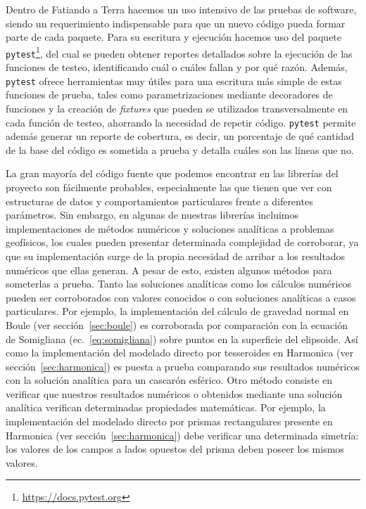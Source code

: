 Dentro de Fatiando a Terra hacemos un uso intensivo de las pruebas de software,
siendo un requerimiento indispensable para que un nuevo código pueda formar
parte de cada paquete.
Para su escritura y ejecución hacemos uso del paquete
\texttt{pytest}\footnote{\url{https://docs.pytest.org}}, del cual se pueden
obtener reportes detallados sobre la ejecución de las funciones de testeo,
identificando cuál o cuáles fallan y por qué razón.
Además, \texttt{pytest} ofrece herramientas muy útiles para una escritura más
simple de estas funciones de prueba, tales como parametrizaciones mediante
decoradores de funciones y la creación de \emph{fixtures} que pueden se
utilizados transversalmente en cada función de testeo, ahorrando la necesidad
de repetir código.
\texttt{pytest} permite además generar un reporte de cobertura, es decir, un
porcentaje de qué cantidad de la base del código es sometida a prueba y
detalla cuáles son las líneas que no.

La gran mayoría del código fuente que podemos encontrar en las librerías del
proyecto son fácilmente probables, especialmente las que tienen que ver con
estructuras de datos y comportamientos particulares frente a diferentes
parámetros.
Sin embargo, en algunas de nuestras librerías incluimos implementaciones de
métodos numéricos y soluciones analíticas a problemas geofísicos, los cuales
pueden presentar determinada complejidad de corroborar, ya que su
implementación surge de la propia necesidad de arribar a los resultados
numéricos que ellas generan.
A pesar de esto, existen algunos métodos para someterlas a prueba.
Tanto las soluciones analíticas como los cálculos numéricos pueden ser
corroborados con valores conocidos o con soluciones analíticas a casos
particulares.
Por ejemplo, la implementación del cálculo de gravedad normal en Boule (ver
sección~\ref{sec:boule}) es corroborada por comparación con la ecuación de
Somigliana (ec.~\ref{eq:somigliana}) sobre puntos en la superficie del
elipsoide.
Así como la implementación del modelado directo por tesseroides en Harmonica
(ver sección~\ref{sec:harmonica}) es puesta a prueba comparando sus resultados
numéricos con la solución analítica para un cascarón esférico.
Otro método consiste en verificar que nuestros resultados numéricos o obtenidos
mediante una solución analítica verifican determinadas propiedades matemáticas.
Por ejemplo, la implementación del modelado directo por prismas rectangulares
presente en Harmonica (ver sección~\ref{sec:harmonica}) debe verificar una
determinada simetría: los valores de los campos a lados opuestos del prisma
deben poseer los mismos valores.

